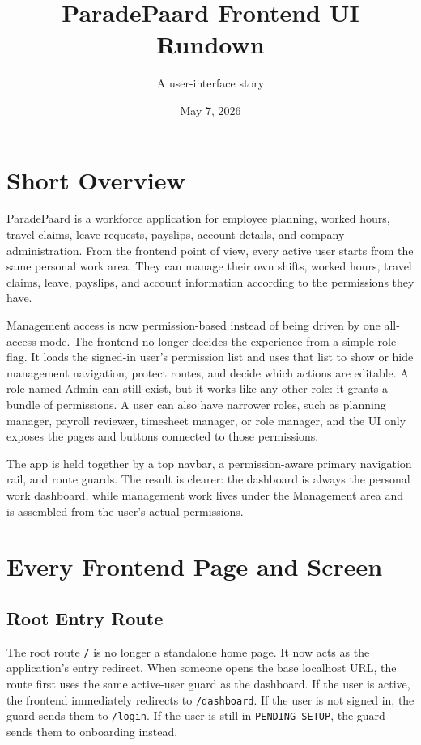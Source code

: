 \documentclass[11pt]{article}
\title{ParadePaard Frontend UI Rundown}
\author{A user-interface story}
\date{May 7, 2026}
\newcommand{\code}[1]{\nolinkurl{#1}}
\begin{document}
\maketitle

\section{Short Overview}

ParadePaard is a workforce application for employee planning, worked hours, travel claims, leave requests, payslips, account details, and company administration. From the frontend point of view, every active user starts from the same personal work area. They can manage their own shifts, worked hours, travel claims, leave, payslips, and account information according to the permissions they have.

Management access is now permission-based instead of being driven by one all-access mode. The frontend no longer decides the experience from a simple role flag. It loads the signed-in user's permission list and uses that list to show or hide management navigation, protect routes, and decide which actions are editable. A role named Admin can still exist, but it works like any other role: it grants a bundle of permissions. A user can also have narrower roles, such as planning manager, payroll reviewer, timesheet manager, or role manager, and the UI only exposes the pages and buttons connected to those permissions.

The app is held together by a top navbar, a permission-aware primary navigation rail, and route guards. The result is clearer: the dashboard is always the personal work dashboard, while management work lives under the Management area and is assembled from the user's actual permissions.
\section{Every Frontend Page and Screen}

\subsection{Root Entry Route}

The root route \code{/} is no longer a standalone home page. It now acts as the application's entry redirect. When someone opens the base localhost URL, the route first uses the same active-user guard as the dashboard. If the user is active, the frontend immediately redirects to \code{/dashboard}. If the user is not signed in, the guard sends them to \code{/login}. If the user is still in \code{PENDING_SETUP}, the guard sends them to onboarding instead.
\end{document}

